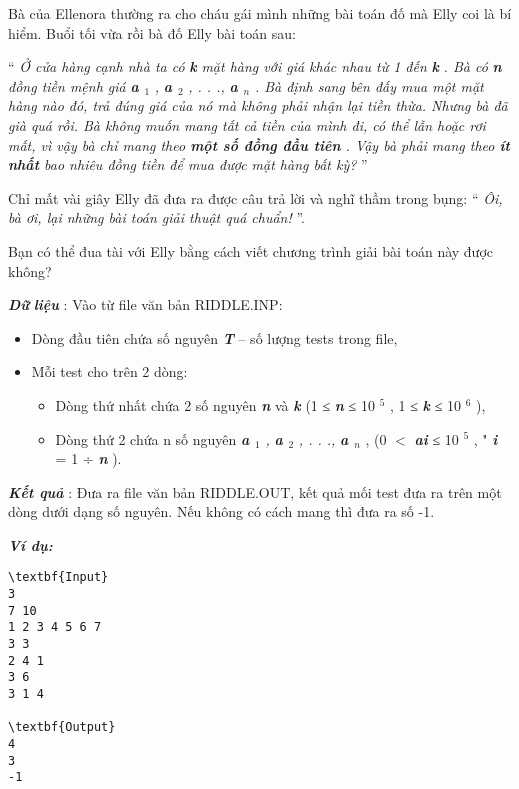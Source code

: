 

Bà của Ellenora thường ra cho cháu gái mình những bài toán đố mà Elly coi là bí hiểm. Buổi tối vừa rồi bà đố Elly bài toán sau:

“ \emph{ Ở cửa hàng cạnh nhà ta có }\textbf{\emph{ k }}\emph{ mặt hàng với giá khác nhau từ 1 đến }\textbf{\emph{ k }}\emph{ . Bà có }\textbf{\emph{ n }}\emph{ đồng tiền mệnh giá }\textbf{\emph{ a $_ 1 $}}\emph{ , }\textbf{\emph{ a $_ 2 $}}\emph{ , . . ., }\textbf{\emph{ a $_ n $}}\emph{ . Bà định sang bên đấy mua một mặt hàng nào đó, trả đúng giá của nó mà không phải nhận lại tiền thừa. Nhưng bà đã già quá rồi. Bà không muốn mang tất cả tiền của mình đi, có thể lẫn hoặc rơi mất, vì vậy bà chỉ mang theo \textbf{ một số đồng đầu tiên } . Vậy bà phải mang theo \textbf{ ít nhất } bao nhiêu đồng tiền để mua được mặt hàng bất kỳ? } ”

Chỉ mất vài giây Elly đã đưa ra được câu trả lời và nghĩ thầm trong bụng: “ \emph{ Ôi, bà ơi, lại những bài toán giải thuật quá chuẩn! } ”.

Bạn có thể đua tài với Elly bằng cách viết chương trình giải bài toán này được không?

\textbf{\emph{Dữ }}\textbf{\emph{ liệu }} : Vào từ file văn bản RIDDLE.INP:
\begin{itemize}
	\item Dòng đầu tiên chứa số nguyên \textbf{\emph{ T }} – số lượng tests trong file,
	\item Mỗi test cho trên 2 dòng:
\begin{itemize}
	\item Dòng thứ nhất chứa 2 số nguyên \textbf{\emph{ n }} và \textbf{\emph{ k }} (1 ≤ \textbf{\emph{ n }} ≤ 10 $^ 5 $ , 1 ≤ \textbf{\emph{ k }} ≤ 10 $^ 6 $ ),
	\item Dòng thứ 2 chứa n số nguyên \textbf{\emph{ a $_ 1 $}}\emph{ , }\textbf{\emph{ a $_ 2 $}}\emph{ , . . ., }\textbf{\emph{ a $_ n $}} , (0 $<$ \textbf{\emph{ ai }} ≤ 10 $^ 5 $ , " \textbf{\emph{ i }} = 1 ÷ \textbf{\emph{ n }} ).
\end{itemize}
\end{itemize}

\textbf{\emph{Kết quả }} : Đưa ra file văn bản RIDDLE.OUT, kết quả mối test đưa ra trên một dòng dưới dạng số nguyên. Nếu không có cách mang thì đưa ra số -1.

\textbf{\emph{Ví dụ: }}
\begin{verbatim}
\textbf{Input}
3
7 10
1 2 3 4 5 6 7
3 3
2 4 1
3 6
3 1 4

\textbf{Output}
4
3
-1\end{verbatim}